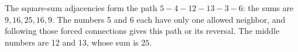 The square-sum adjacencies form the path $5-4-12-13-3-6$: the sums are $9,16,25,16,9$. The numbers 5 and 6 each have only one allowed neighbor, and following those forced connections gives this path or its reversal. The middle numbers are 12 and 13, whose sum is $\boxed{25}$.
